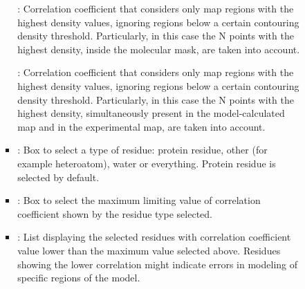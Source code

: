 \begin{itemize}
\begin{itemize}
\begin{itemize}
\begin{itemize}
           : Correlation coefficient that considers only map regions with the highest density values, ignoring regions below a certain contouring density threshold. Particularly, in this case the N points with the highest density, inside the molecular mask, are taken into account.
           
           : Correlation coefficient that considers only map regions with the highest density values, ignoring regions below a certain contouring density threshold. Particularly, in this case the N points with the highest density, simultaneously present in the model-calculated map and in the experimental map, are taken into account.

          \item {}: Box to select a type of residue: protein residue, other (for example heteroatom), water or everything. Protein residue is selected by default.
          \item {}: Box to select the maximum limiting value of correlation coefficient shown by the residue type selected. 
          \item {}: List displaying the selected residues with correlation coefficient value lower than the maximum value selected above. Residues showing the lower correlation might indicate errors in modeling of specific regions of the model.
         \end{itemize}
         

\end{itemize}
\end{itemize}
\end{itemize}
